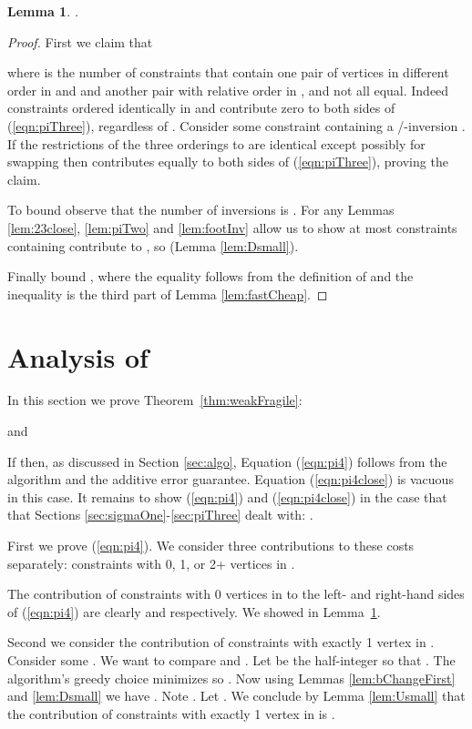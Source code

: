 \documentclass[dvips,11pt,letter]{article}
\newtheorem{lemma}[theorem]{Lemma}
\begin{document}
{\begin{lemma}\label{lem:piThree}
.
\end{lemma}
\begin{proof}
First we claim that

where  is the number of constraints that contain one pair of vertices  in different order in  and  and another pair  with relative order in ,  and  not all equal. Indeed constraints ordered identically in  and  contribute zero to both sides of (\ref{eqn:piThree}), regardless of . Consider some constraint  containing a  /-inversion . If the restrictions of the three orderings to  are identical except possibly for swapping  then  contributes equally to both sides of (\ref{eqn:piThree}), proving the claim.

To bound  observe that the number of inversions  is . For any  Lemmas \ref{lem:23close}, \ref{lem:piTwo} and \ref{lem:footInv} allow us to show at most  constraints containing  contribute to , so  (Lemma \ref{lem:Dsmall}).

Finally bound , where the equality follows from the definition of  and the inequality is the third part of Lemma \ref{lem:fastCheap}.
\end{proof}


\section{Analysis of }  \label{sec:analysis}
In this section we prove Theorem~\ref{thm:weakFragile}:

and


If  then, as discussed in Section \ref{sec:algo}, Equation (\ref{eqn:pi4}) follows from the algorithm and the additive error guarantee. Equation (\ref{eqn:pi4close}) is vacuous in this case. It remains to show (\ref{eqn:pi4}) and (\ref{eqn:pi4close}) in the case that that Sections \ref{sec:sigmaOne}-\ref{sec:piThree} dealt with: .

First we prove (\ref{eqn:pi4}). We consider three contributions to these costs separately: constraints with 0, 1, or 2+ vertices in . 

The contribution of constraints with 0 vertices in  to the left- and right-hand sides of (\ref{eqn:pi4}) are clearly  and  respectively. We showed  in Lemma~\ref{lem:piThree}.

Second we consider the contribution of constraints with exactly 1 vertex in . Consider some .  We want to compare  and . Let  be the half-integer so that . The algorithm's greedy choice minimizes  so . Now using Lemmas \ref{lem:bChangeFirst} and \ref{lem:Dsmall} we have .  Note . Let .
We conclude by Lemma \ref{lem:Usmall} that the contribution of constraints with exactly 1 vertex in  is .

}
\end{document}
